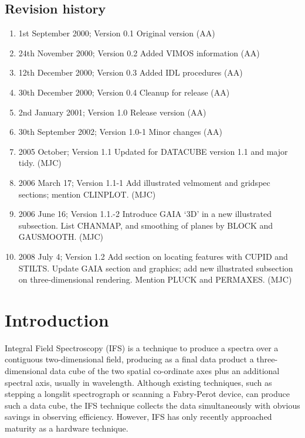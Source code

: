 \documentclass[twoside,11pt]{starlink}
\begin{document}
\scfrontmatter

 \subsection*{Revision history}

 \begin{enumerate}
   \item 1st September 2000; Version 0.1 Original version (AA)
   \item 24th November 2000; Version 0.2 Added VIMOS information (AA)
   \item 12th December 2000; Version 0.3 Added IDL procedures (AA)
   \item 30th December 2000; Version 0.4 Cleanup for release (AA)
   \item 2nd January 2001; Version 1.0 Release version (AA)
   \item 30th September 2002; Version 1.0-1 Minor changes (AA)
   \item 2005 October; Version 1.1  Updated for DATACUBE version 1.1
                                    and major tidy. (MJC)
  \item 2006 March 17; Version 1.1-1 Add illustrated velmoment and gridspec
                       sections; mention CLINPLOT. (MJC)
  \item 2006 June 16; Version 1.1.-2 Introduce GAIA `3D' in a new
                      illustrated subsection.  List CHANMAP, and smoothing
                      of planes by BLOCK and GAUSMOOTH. (MJC)
  \item 2008 July 4;  Version 1.2  Add section on locating features with CUPID
                      and STILTS.  Update GAIA section and graphics; add new
                      illustrated subsection on three-dimensional rendering.
                      Mention PLUCK and PERMAXES.  (MJC)

 \end{enumerate}

\latex{\cleardoublepage}
\newpage



\section{Introduction\label{sc16_intro}}

Integral Field Spectroscopy (IFS) is a technique to produce a spectra
over a contiguous two-dimensional field, producing as a final data
product a three-dimensional data cube of the two spatial co-ordinate
axes plus an additional spectral axis, usually in wavelength.  Although
existing techniques, such as stepping a longslit spectrograph or
scanning a Fabry-Perot device, can produce such a data cube, the IFS
technique collects the data simultaneously with obvious savings in
observing efficiency.  However, IFS has only recently approached
maturity as a hardware technique.
\end{document}
